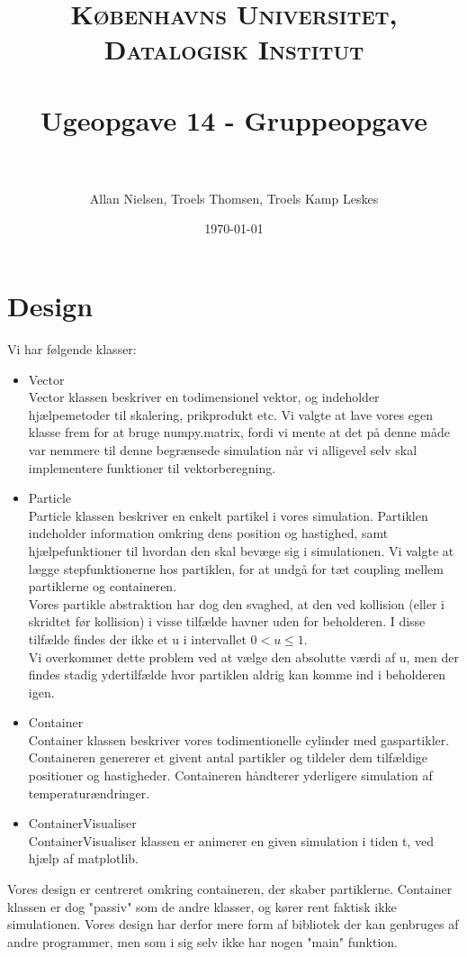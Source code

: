 \documentclass[paper=a4, fontsize=11pt]{scrartcl} %
\title{	
\normalfont \normalsize 
\textsc{Københavns Universitet, Datalogisk Institut} \\ [25pt] %
\horrule{0.5pt} \\[0.4cm] %
\huge Ugeopgave 14 - Gruppeopgave \\ %
\horrule{2pt} \\[0.5cm] %
}
\author{Allan Nielsen, Troels Thomsen, Troels Kamp Leskes} %
\date{\normalsize\today} %
\numberwithin{equation}{section} %
\numberwithin{figure}{section} %
\numberwithin{table}{section} %
\begin{document}
\maketitle %

\section*{Design}

Vi har følgende klasser:

\begin{itemize}
	\item Vector\\
		Vector klassen beskriver en todimensionel vektor, og indeholder hjælpemetoder til skalering, prikprodukt etc.
		Vi valgte at lave vores egen klasse frem for at bruge numpy.matrix, fordi vi mente at det på denne måde var nemmere til denne begrænsede simulation når vi alligevel selv skal implementere funktioner til vektorberegning.
	\item Particle\\
		Particle klassen beskriver en enkelt partikel i vores simulation. Partiklen indeholder information omkring dens position og hastighed, samt hjælpefunktioner til hvordan den skal bevæge sig i simulationen.
		Vi valgte at lægge stepfunktionerne hos partiklen, for at undgå for tæt coupling mellem partiklerne og containeren.\\
		Vores partikle abstraktion har dog den svaghed, at den ved kollision (eller i skridtet før kollision) i visse tilfælde havner uden for beholderen. I disse tilfælde findes der ikke et u i intervallet $0 < u \leq 1$. \\
		Vi overkommer dette problem ved at vælge den absolutte værdi af u, men der findes stadig ydertilfælde hvor partiklen aldrig kan komme ind i beholderen igen.
	\item Container\\
		Container klassen beskriver vores todimentionelle cylinder med gaspartikler. Containeren genererer et givent antal partikler og tildeler dem tilfældige positioner og hastigheder. Containeren håndterer yderligere simulation af temperaturændringer.
	\item ContainerVisualiser\\
		ContainerVisualiser klassen er animerer en given simulation i tiden t, ved hjælp af matplotlib.
\end{itemize}

Vores design er centreret omkring containeren, der skaber partiklerne. Container klassen er dog "passiv" som de andre klasser, og kører rent faktisk ikke simulationen. Vores design har derfor mere form af bibliotek der kan genbruges af andre programmer, men som i sig selv ikke har nogen "main" funktion.\\
\end{document}
